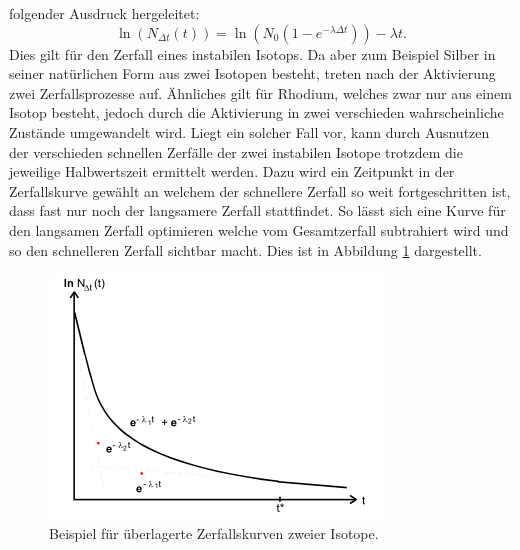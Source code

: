 folgender Ausdruck hergeleitet:
\begin{equation}
  \ln(N_{\Delta t}(t)) =\ln(N_0 (1-e^{- \lambda \Delta t})) - \lambda t  .
  \label{eqn:Zerfallskonstante}
\end{equation}
Dies gilt für den Zerfall eines instabilen Isotops. Da aber zum Beispiel Silber in seiner natürlichen Form aus zwei Isotopen besteht, treten nach der Aktivierung zwei Zerfallsprozesse
auf. Ähnliches gilt für Rhodium, welches zwar nur aus einem Isotop besteht, jedoch durch die Aktivierung in zwei verschieden wahrscheinliche Zustände umgewandelt wird.
Liegt ein solcher Fall vor, kann durch Ausnutzen der verschieden schnellen Zerfälle der zwei instabilen Isotope trotzdem die jeweilige Halbwertszeit ermittelt werden. Dazu wird ein Zeitpunkt
in der Zerfallskurve gewählt an welchem der schnellere Zerfall so weit fortgeschritten ist, dass fast nur noch der langsamere Zerfall stattfindet. So lässt sich eine Kurve für den
langsamen Zerfall optimieren welche vom Gesamtzerfall subtrahiert wird und so den schnelleren Zerfall sichtbar macht. Dies ist in Abbildung \ref{fig:2Isotope} dargestellt.
\FloatBarrier
\begin{figure}
  \centering
  \includegraphics{images/2Isotope.png}
  \caption{Beispiel für überlagerte Zerfallskurven zweier Isotope.\cite{sample}}
  \label{fig:2Isotope}
\end{figure}
\FloatBarrier
